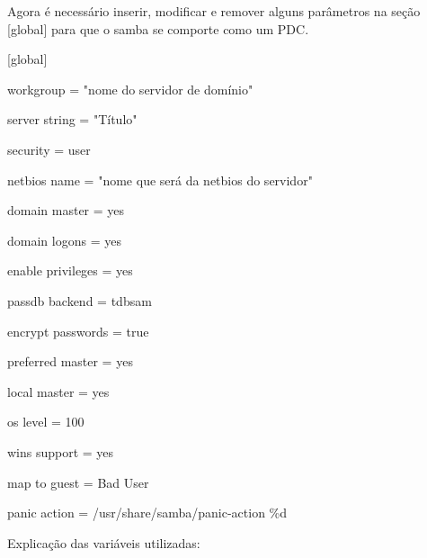 Agora é necessário inserir, modificar e remover alguns parâmetros na seção [global] para que o samba se comporte como um PDC.
{\raggedright

[global] 

	workgroup = "nome do servidor de domínio" 

	server string = "Título"       

	security = user

	netbios name = "nome que será da netbios do servidor"

	domain master = yes

	domain logons = yes

	enable privileges = yes

	passdb backend = tdbsam
	
	encrypt passwords = true

	preferred master = yes

	local master = yes

	os level = 100

	wins support = yes

	map to guest = Bad User

	panic action = /usr/share/samba/panic-action \%d
}

Explicação das variáveis utilizadas:

